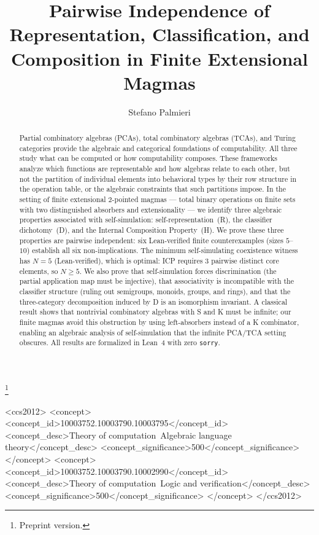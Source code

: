 \documentclass[sigconf,screen]{acmart}
\theoremstyle{remark}
\begin{document}
\title{Pairwise Independence of Representation, Classification, and Composition in Finite Extensional Magmas}
\thanks{Preprint version.}

\author{Stefano Palmieri}

\begin{CCSXML}
<ccs2012>
<concept>
<concept_id>10003752.10003790.10003795</concept_id>
<concept_desc>Theory of computation~Algebraic language theory</concept_desc>
<concept_significance>500</concept_significance>
</concept>
<concept>
<concept_id>10003752.10003790.10002990</concept_id>
<concept_desc>Theory of computation~Logic and verification</concept_desc>
<concept_significance>500</concept_significance>
</concept>
</ccs2012>
\end{CCSXML}



\begin{abstract}
Partial combinatory algebras (PCAs), total combinatory algebras (TCAs), and Turing categories provide the algebraic and categorical foundations of computability. All three study what can be computed or how computability composes. These frameworks analyze which functions are representable and how algebras relate to each other, but not the partition of individual elements into behavioral types by their row structure in the operation table, or the algebraic constraints that such partitions impose. In the setting of finite extensional 2-pointed magmas --- total binary operations on finite sets with two distinguished absorbers and extensionality --- we identify three algebraic properties associated with self-simulation: self-representation~(R), the classifier dichotomy~(D), and the Internal Composition Property~(H). We prove these three properties are pairwise independent: six Lean-verified finite counterexamples (sizes $5$--$10$) establish all six non-implications. The minimum self-simulating coexistence witness has $N\!=\!5$ (Lean-verified), which is optimal: ICP requires 3 pairwise distinct core elements, so $N \geq 5$. We also prove that self-simulation forces discrimination (the partial application map must be injective), that associativity is incompatible with the classifier structure (ruling out semigroups, monoids, groups, and rings), and that the three-category decomposition induced by D is an isomorphism invariant. A classical result shows that nontrivial combinatory algebras with S and K must be infinite; our finite magmas avoid this obstruction by using left-absorbers instead of a K combinator, enabling an algebraic analysis of self-simulation that the infinite PCA/TCA setting obscures. All results are formalized in Lean~4 with zero \texttt{sorry}.
\end{abstract}
\end{document}
